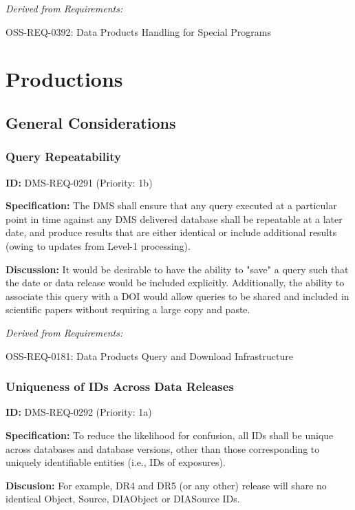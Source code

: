 \documentclass[SE,toc,lsstdraft]{lsstdoc}
\begin{document}
\emph{Derived from Requirements:}

OSS-REQ-0392:
Data Products Handling for Special Programs \newline

\section{Productions}

\subsection{General Considerations}

\subsubsection{Query Repeatability}

\label{DMS-REQ-0291}
\textbf{ID:} DMS-REQ-0291 (Priority: 1b)

\textbf{Specification:} The DMS shall ensure that any query executed at a particular point in time against any DMS delivered database shall be repeatable at a later date, and produce results that are either identical or include additional results (owing to updates from Level-1 processing).

\textbf{Discussion:} It would be desirable to have the ability to "save" a query such that the date or data release would be included explicitly. Additionally, the ability to associate this query with a DOI would allow queries to be shared and included in scientific papers without requiring a large copy and paste.

\emph{Derived from Requirements:}

OSS-REQ-0181:
Data Products Query and Download Infrastructure \newline

\subsubsection{Uniqueness of IDs Across Data Releases}

\label{DMS-REQ-0292}
\textbf{ID:} DMS-REQ-0292 (Priority: 1a)

\textbf{Specification:} To reduce the likelihood for confusion, all IDs shall be unique across databases and database versions, other than those corresponding to uniquely identifiable entities (i.e., IDs of exposures).

\textbf{Discusion:} For example, DR4 and DR5 (or any other) release will share no identical Object, Source, DIAObject or DIASource IDs.
\end{document}
